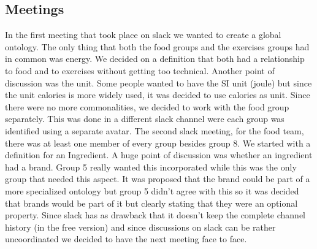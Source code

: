\subsection{Meetings}

In the first meeting that took place on slack we wanted to create a global ontology. The only thing that both the food groups and the exercises groups had in common was energy. We decided on a definition that both had a relationship to food and to exercises without getting too technical. Another point of discussion was the unit. Some people wanted to have the SI unit (joule) but since the unit calories is more widely used, it was decided to use calories as unit. Since there were no more commonalities, we decided to work with the food group separately. This was done in a different slack channel were each group was identified using a separate avatar. 
\newline
\newline
\noindent
The second slack meeting, for the food team, there was at least one member of every group besides group 8. We started with a definition for an Ingredient. A huge point of discussion was whether an ingredient had a brand. Group 5 really wanted this incorporated while this was the only group that needed this aspect. It was proposed that the brand could be part of a more specialized ontology but group 5 didn't agree with this so it was decided that brands would be part of it but clearly stating that they were an optional property. Since slack has as drawback that it doesn't keep the complete channel history (in the free version) and since discussions on slack can be rather uncoordinated we decided to have the next meeting face to face. 
\newline
\newline
\noindent
